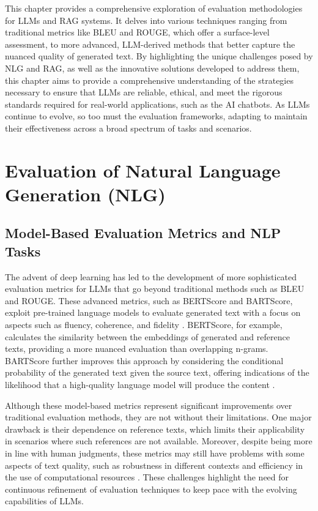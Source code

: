 This chapter provides a comprehensive exploration of evaluation methodologies for LLMs and RAG systems. It delves into various techniques ranging from traditional metrics like BLEU and ROUGE, which offer a surface-level assessment, to more advanced, LLM-derived methods that better capture the nuanced quality of generated text. By highlighting the unique challenges posed by NLG and RAG, as well as the innovative solutions developed to address them, this chapter aims to provide a comprehensive understanding of the strategies necessary to ensure that LLMs are reliable, ethical, and meet the rigorous standards required for real-world applications, such as the AI chatbots. As LLMs continue to evolve, so too must the evaluation frameworks, adapting to maintain their effectiveness across a broad spectrum of tasks and scenarios.

\section{Evaluation of Natural Language Generation (NLG)}

\subsection{Model-Based Evaluation Metrics and NLP Tasks}

The advent of deep learning has led to the development of more sophisticated evaluation metrics for LLMs that go beyond traditional methods such as BLEU and ROUGE. These advanced metrics, such as BERTScore and BARTScore, exploit pre-trained language models to evaluate generated text with a focus on aspects such as fluency, coherence, and fidelity \cite{zhang2019bertscore, yuan2021bartscore}. BERTScore, for example, calculates the similarity between the embeddings of generated and reference texts, providing a more nuanced evaluation than overlapping n-grams. BARTScore further improves this approach by considering the conditional probability of the generated text given the source text, offering indications of the likelihood that a high-quality language model will produce the content \cite{gao2023retrieval}.

Although these model-based metrics represent significant improvements over traditional evaluation methods, they are not without their limitations. One major drawback is their dependence on reference texts, which limits their applicability in scenarios where such references are not available. Moreover, despite being more in line with human judgments, these metrics may still have problems with some aspects of text quality, such as robustness in different contexts and efficiency in the use of computational resources \cite{he2022blind}. These challenges highlight the need for continuous refinement of evaluation techniques to keep pace with the evolving capabilities of LLMs.

